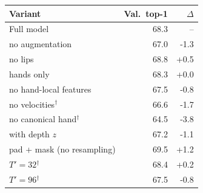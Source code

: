 \begin{tabular}{lrr}
\toprule
Variant & Val.\ top-1 & $\Delta$ \\
\midrule
Full model & 68.3 & -- \\
no augmentation & 67.0 & -1.3 \\
no lips & 68.8 & +0.5 \\
hands only & 68.3 & +0.0 \\
no hand-local features & 67.5 & -0.8 \\
no velocities$^\dagger$ & 66.6 & -1.7 \\
no canonical hand$^\dagger$ & 64.5 & -3.8 \\
with depth $z$ & 67.2 & -1.1 \\
pad + mask (no resampling) & 69.5 & +1.2 \\
$T'=32$$^\dagger$ & 68.4 & +0.2 \\
$T'=96$$^\dagger$ & 67.5 & -0.8 \\
\bottomrule
\end{tabular}
